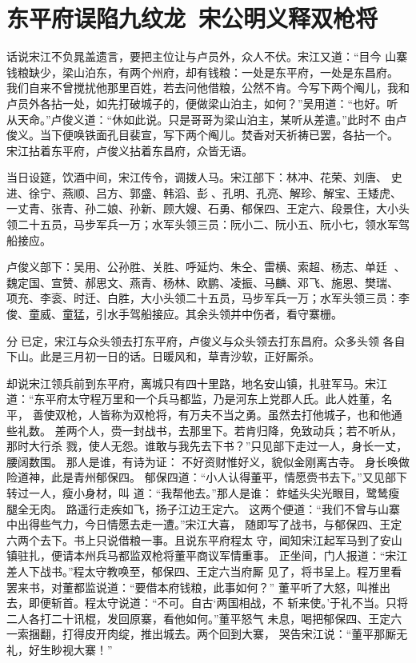 \chapter{东平府误陷九纹龙~宋公明义释双枪将}

话说宋江不负晁盖遗言，要把主位让与卢员外，众人不伏。宋江又道：“目今
山寨钱粮缺少，梁山泊东，有两个州府，却有钱粮：一处是东平府，一处是东昌府。
我们自来不曾搅扰他那里百姓，若去问他借粮，公然不肯。今写下两个阄儿，我和
卢员外各拈一处，如先打破城子的，便做梁山泊主，如何？”吴用道：“也好。听
从天命。”卢俊义道：“休如此说。只是哥哥为梁山泊主，某听从差遣。”此时不
由卢俊义。当下便唤铁面孔目裴宣，写下两个阄儿。焚香对天祈祷已罢，各拈一个。
宋江拈着东平府，卢俊义拈着东昌府，众皆无语。

当日设筵，饮酒中间，宋江传令，调拨人马。宋江部下：林冲、花荣、刘唐、
史进、徐宁、燕顺、吕方、郭盛、韩滔、彭、孔明、孔亮、解珍、解宝、王矮虎、
一丈青、张青、孙二娘、孙新、顾大嫂、石勇、郁保四、王定六、段景住，大小头
领二十五员，马步军兵一万；水军头领三员：阮小二、阮小五、阮小七，领水军驾
船接应。

卢俊义部下：吴用、公孙胜、关胜、呼延灼、朱仝、雷横、索超、杨志、单廷
、魏定国、宣赞、郝思文、燕青、杨林、欧鹏、凌振、马麟、邓飞、施恩、樊瑞、
项充、李衮、时迁、白胜，大小头领二十五员，马步军兵一万；水军头领三员：李
俊、童威、童猛，引水手驾船接应。其余头领并中伤者，看守寨栅。

分已定，宋江与众头领去打东平府，卢俊义与众头领去打东昌府。众多头领
各自下山。此是三月初一日的话。日暖风和，草青沙软，正好厮杀。

却说宋江领兵前到东平府，离城只有四十里路，地名安山镇，扎驻军马。宋江
道：“东平府太守程万里和一个兵马都监，乃是河东上党郡人氏。此人姓董，名平，
善使双枪，人皆称为双枪将，有万夫不当之勇。虽然去打他城子，也和他通些礼数。
差两个人，赍一封战书，去那里下。若肯归降，免致动兵；若不听从，那时大行杀
戮，使人无怨。谁敢与我先去下书？”只见部下走过一人，身长一丈，腰阔数围。
那人是谁，有诗为证：
不好资财惟好义，貌似金刚离古寺。
身长唤做险道神，此是青州郁保四。
郁保四道：“小人认得董平，情愿赍书去下。”又见部下转过一人，瘦小身材，叫
道：“我帮他去。”那人是谁：
蚱蜢头尖光眼目，鹭鸶瘦腿全无肉。
路遥行走疾如飞，扬子江边王定六。
这两个便道：“我们不曾与山寨中出得些气力，今日情愿去走一遭。”宋江大喜，
随即写了战书，与郁保四、王定六两个去下。书上只说借粮一事。且说东平府程太
守，闻知宋江起军马到了安山镇驻扎，便请本州兵马都监双枪将董平商议军情重事。
正坐间，门人报道：“宋江差人下战书。”程太守教唤至，郁保四、王定六当府厮
见了，将书呈上。程万里看罢来书，对董都监说道：“要借本府钱粮，此事如何？”
董平听了大怒，叫推出去，即便斩首。程太守说道：“不可。自古‘两国相战，不
斩来使。’于礼不当。只将二人各打二十讯棍，发回原寨，看他如何。”董平怒气
未息，喝把郁保四、王定六一索捆翻，打得皮开肉绽，推出城去。两个回到大寨，
哭告宋江说：“董平那厮无礼，好生眇视大寨！”

